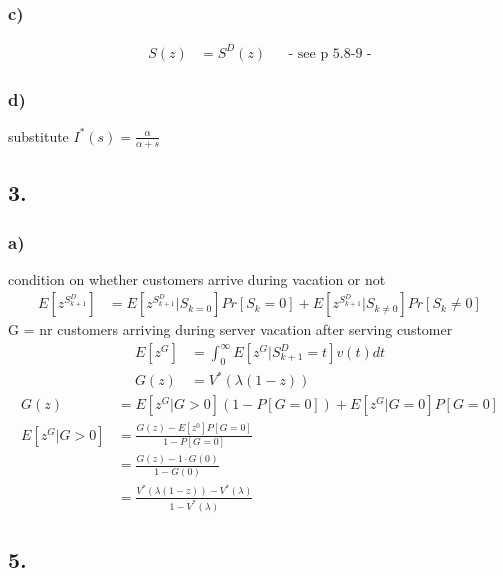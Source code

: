 \subsubsection*{ c) }

\begin{align*}
S\left(z\right)&=S^{D}\left(z\right)&& \text{-  see p 5.8-9 -}
\end{align*}

\subsubsection*{ d) }

substitute $I^{{\ast }}\left(s\right)=\frac{\alpha }{\alpha +s}$

\subsection*{ 3. }

\subsubsection*{ a) }
condition on whether customers arrive during vacation or not
\begin{align*}
E\left[z^{{S_{{k+1}}^{D}}}\right]&=E\left[z^{{S_{{k+1}}^{D}}}|S_{{k=0}}\right]Pr\left[S_{k}= 0\right]+E\left[z^{{S_{{k+1}}^{D}}}|S_{{k\neq 0}}\right]Pr\left[S_{k}\neq 0\right]
\end{align*}
G = nr customers arriving during server vacation after serving customer
\begin{align*}
E\left[z^{G}\right]&=\int_{0}^{\infty }E\left[z^{G}|S_{{k+1}}^{D}=t\right]v\left(t\right)dt\\
G\left(z\right)&=V^{{\ast }}\left(\lambda \left(1-z\right)\right)
\end{align*}
\begin{align*}
G\left(z\right)&=E\left[z^{G}|G> 0\right]\left(1-P\left[G=0\right]\right)+E\left[z^{G}|G=0\right]P\left[G=0\right]\\
E\left[z^{G}|G> 0\right]&=\frac{G\left(z\right)-E\left[z^{0}\right]P\left[G=0\right]}{1-P\left[G=0\right]}\\
&=\frac{G\left(z\right)-1\cdot G\left(0\right)}{1-G\left(0\right)}\\
&=\frac{V^{{\ast }}\left(\lambda \left(1-z\right)\right)-V^{{\ast }}\left(\lambda \right)}{1-V^{{\ast }}\left(\lambda \right)}
\end{align*}

\subsection*{ 5. }

